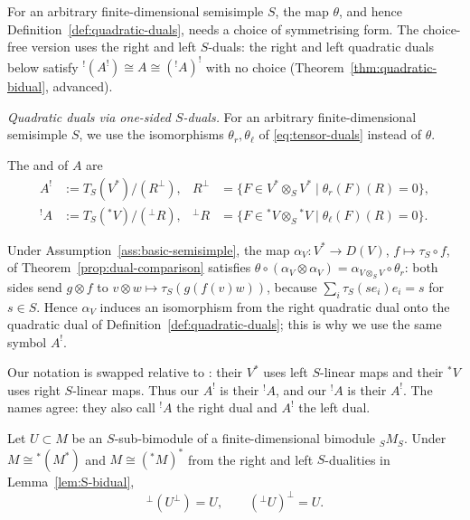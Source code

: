 \begin{advanced}
\begin{remark}[General $S$]
For an arbitrary finite-dimensional semisimple $S$, the map $\theta$, and hence Definition~\ref{def:quadratic-duals}, needs a choice of symmetrising form.
The choice-free version uses the right and left $S$-duals: the right and left quadratic duals below satisfy ${}^!(A^!)\cong A\cong({}^!A)^!$ with no choice (Theorem~\ref{thm:quadratic-bidual}, advanced).
\end{remark}

\emph{Quadratic duals via one-sided $S$-duals.}
For an arbitrary finite-dimensional semisimple $S$, we use the isomorphisms $\theta_r,\theta_\ell$ of \eqref{eq:tensor-duals} instead of $\theta$.

\begin{definition}\label{def:S-quadratic-duals}
The  and  of $A$ are
\begin{equation}\label{eq:S-quadratic-duals}
\begin{aligned}
A^!&:=T_S(V^*)/(R^\perp),
&R^\perp&=\{F\in V^*\otimes_S V^*\mid\theta_r(F)(R)=0\},\\
{}^!A&:=T_S({}^*V)/({}^\perp R),
&{}^\perp R&=\{F\in{}^*V\otimes_S{}^*V\mid\theta_\ell(F)(R)=0\}.
\end{aligned}
\end{equation}
\end{definition}

Under Assumption~\ref{ass:basic-semisimple}, the map $\alpha_V:V^*\to D(V)$, $f\mapsto\tau_S\circ f$, of Theorem~\ref{prop:dual-comparison} satisfies $\theta\circ(\alpha_V\otimes\alpha_V)=\alpha_{V\otimes_SV}\circ\theta_r$: both sides send $g\otimes f$ to $v\otimes w\mapsto\tau_S(g(f(v)w))$, because $\sum_i\tau_S(se_i)e_i=s$ for $s\in S$.
Hence $\alpha_V$ induces an isomorphism from the right quadratic dual onto the quadratic dual of Definition~\ref{def:quadratic-duals}; this is why we use the same symbol $A^!$.

Our notation is swapped relative to \cite[\S2.7 and Definition~2.8.1]{BGS96}: their $V^*$ uses left $S$-linear maps and their ${}^*V$ uses right $S$-linear maps.
Thus our $A^!$ is their ${}^!A$, and our ${}^!A$ is their $A^!$.
The names agree: they also call ${}^!A$ the right dual and $A^!$ the left dual.

\begin{lemma}\label{lem:S-double-orthogonal}
Let $U\subset M$ be an $S$-sub-bimodule of a finite-dimensional bimodule $ {}_SM_S$.
Under $M\cong{}^*(M^*)$ and $M\cong({}^*M)^*$ from the right and left $S$-dualities in Lemma~\ref{lem:S-bidual},
\[
{}^\perp(U^\perp)=U,\qquad ({}^\perp U)^\perp=U.
\]
\end{lemma}


\end{advanced}
